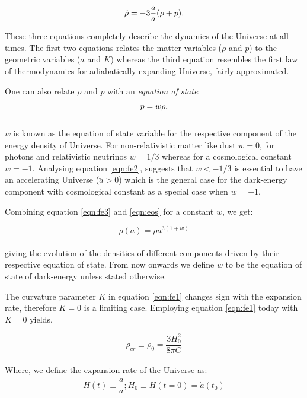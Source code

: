 \begin{equation}
\centering
\dot{\rho} = -3 \dfrac{\dot{a}}{a}(\rho + p).
\label{eqn:fe3}
\end{equation}

These three equations completely describe the dynamics of the Universe at all times.
The first two equations relates the matter variables ($\rho$ and $p$) to the geometric
variables ($a$ and $K$) whereas the third equation resembles the first law of 
thermodynamics for adiabatically expanding Universe, fairly approximated.

One can also relate $\rho$ and $p$ with an {\it equation of state}:

\begin{equation}
\centering
p = w \rho,
\label{eqn:eos}
\end{equation}
\\
$w$ is known as the equation of state variable for the respective component
of the energy density of Universe. For non-relativistic matter like dust $w=0$,
for photons and relativistic neutrinos $w=1/3$ whereas for a cosmological constant
$w=-1$. Analysing equation \ref{eqn:fe2}, suggests that $w<-1/3$ is essential to
have an accelerating Universe ($\ddot{a}>0$) which is the general case for the
dark-energy component with cosmological constant as a special case when $w=-1$.

Combining equation \ref{eqn:fe3} and \ref{eqn:eos} for a constant $w$, we get:

\begin{equation}
	\rho(a) = \rho a^{3(1+w)}
	\label{eqn:rho_t}
\end{equation}
\\
giving the evolution of the densities of different components driven by their 
respective equation of state. From now onwards we define $w$ to be the equation of 
state of dark-energy unless stated otherwise.

The curvature parameter $K$ in equation \ref{eqn:fe1} changes sign with the expansion 
rate, therefore $K=0$ is a limiting case. Employing equation \ref{eqn:fe1} today with
$K=0$ yields,

\begin{equation}
	\rho_{cr} \equiv \rho_0 = \dfrac{3H_0^2}{8\pi G}
\end{equation}
\\
Where, we define the expansion rate of the Universe as:
\begin{equation}
	H(t) \equiv \dfrac{\dot{a}}{a}; H_0 \equiv H(t=0) = \dot{a}(t_0)
\end{equation}

